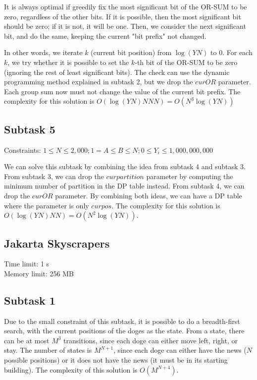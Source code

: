 \documentclass[a4paper]{article}
\begin{document}
It is always optimal if greedily fix the most significant bit of the OR-SUM to be zero, regardless of the other bits. If it is possible, then the most significant bit should be zero; if it is not, it will be one. Then, we consider the next significant bit, and do the same, keeping the current "bit prefix" not changed.

In other words, we iterate $k$ (current bit position) from $\log(YN)$ to $0$. For each $k$, we try whether it is possible to set the $k$-th bit of the OR-SUM to be zero (ignoring the rest of least significant bits). The check can use the dynamic programming method explained in subtask 2, but we drop the $curOR$ parameter. Each group sum now must not change the value of the current bit prefix. The complexity for this solution is $O(\log(YN)NNN) = O(N^3\log(YN))$

\subsection*{Subtask 5}
Constraints: $1\leq N \leq 2,000; 1 = A \leq B \leq N; 0 \leq Y_i \leq 1,000,000,000$

We can solve this subtask by combining the idea from subtask 4 and subtask 3. From subtask 3, we can drop the $curpartition$ parameter by computing the minimum number of partition in the DP table instead. From subtask 4, we can drop the $curOR$ parameter. By combining both ideas, we can have a DP table where the parameter is only $curpos$. The complexity for this solution is $O(\log(YN)NN) = O(N^2\log(YN))$.

\newpage
\begin{center}
	\section*{Jakarta Skyscrapers}
	Time limit: 1 s\\
	Memory limit: 256 MB
\end{center}

\subsection*{Subtask 1}
Due to the small constraint of this subtask, it is possible to do a breadth-first search, with the current positions of the doges as the state. From a state, there can be at most $M^3$ transitions, since each doge can either move left, right, or stay. The number of states is $M^{N+1}$, since each doge can either have the news ($N$ possible positions) or it does not have the news (it must be in its starting building). The complexity of this solution is $O(M^{N+4})$.
\end{document}
